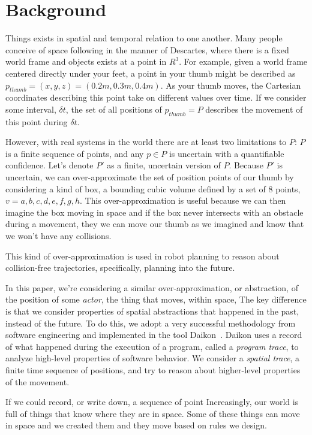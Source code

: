 \section{Background}
\label{sec:background}


Things exists in spatial and temporal relation to one another.
Many people conceive of space following in the manner of Descartes, where there is a fixed world frame and objects exists at a point in $R^3$.
For example, given a world frame centered directly under your feet, a point in your thumb might be described as $p_{thumb} = (x,y,z) = (0.2m, 0.3m, 0.4m)$.
As your thumb moves, the Cartesian coordinates describing this point take on different values over time.
If we consider some interval, $\delta t$, the set of all positions of $p_{thumb} = P$ describes the movement of this point during $\delta t$.

However, with real systems in the world there are at least two limitations to $P$: $P$ is a finite sequence of points, and any $p \in P$ is uncertain with a quantifiable confidence.
Let's denote $P'$ as a finite, uncertain version of $P$.
Because $P'$ is uncertain, we can over-approximate the set of position points of our thumb by considering a kind of box, a bounding cubic volume defined by a set of 8 points, $v = {a,b,c,d,e,f,g,h}$.
This over-approximation is useful because we can then imagine the box moving in space and if the box never intersects with an obstacle during a movement, they we can move our thumb as we imagined and know that we won't have any collisions.

This kind of over-approximation is used in robot planning to reason about collision-free trajectories, specifically, planning into the future.

In this paper, we're considering a similar over-approximation, or abstraction, of the position of some \emph{actor}, the thing that moves, within space, 
The key difference is that we consider properties of spatial abstractions that happened in the past, instead of the future.
To do this, we adopt a very successful methodology from software engineering and implemented in the tool Daikon~\cite{kataoka2001automated}.
Daikon uses a record of what happened during the execution of a program, called a \emph{program trace}, to analyze high-level properties of software behavior.
We consider a \emph{spatial trace}, a finite time sequence of positions, and try to reason about higher-level properties of the movement.

If we could record, or write down, a sequence of point 
Increasingly, our world is full of things that know where they are in space.
Some of these things can move in space and we created them and they move based on rules we design.


